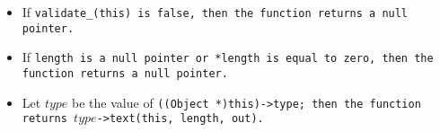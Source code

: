 \begin{itemize}[nosep]

\item If \tt{validate_(this)} is \tt{false},
then the function returns a null pointer.

\item If \tt{length} is a null pointer or \tt{*length} is
equal to zero, then the function returns a null pointer.

\item Let $type$ be the value of \tt{((Object *)this)->type};
then the function returns $type$\tt{->text(this, length, out)}.

\end{itemize}
